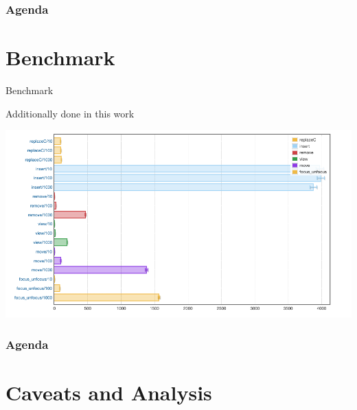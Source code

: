 \documentclass{beamer}
\begin{document}
\begin{frame}
  \frametitle{Agenda}
  \section{Benchmark}
  \tableofcontents[currentsection]
\end{frame}

\begin{frame}[fragile]{Benchmark}

  \begin{block}{Additionally done in this work}
   \begin{minipage}[t]{\linewidth}
    \includegraphics[width=\textwidth]{raz_bench}
  \end{minipage}

  \end{block}

\end{frame}




\begin{frame}
  \frametitle{Agenda}
  \section{Caveats and Analysis}
  \tableofcontents[currentsection]
\end{frame}
\end{document}
